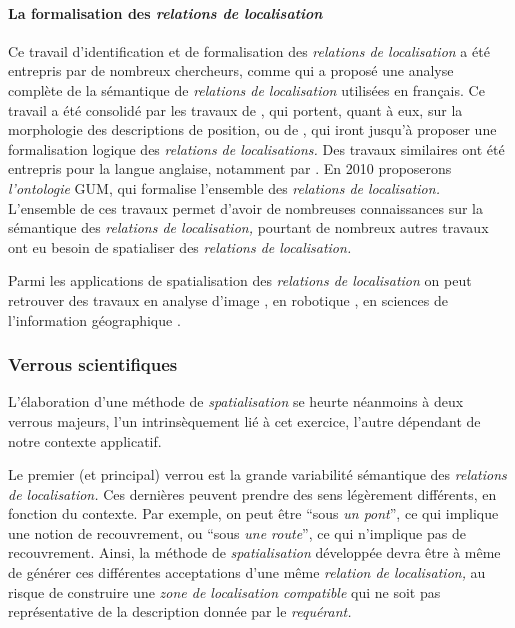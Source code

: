 \paragraph{La formalisation des \emph{relations de localisation}}

Ce travail d'identification et de formalisation des \emph{relations de
  localisation} a été entrepris par de nombreux chercheurs, comme
\textcite{Vandeloise1986} qui a proposé une analyse complète de la
sémantique de \emph{relations de localisation} utilisées en
français. Ce travail a été consolidé par les travaux de
\textcite{Borillo1998}, qui portent, quant à eux, sur la morphologie
des descriptions de position, ou de \textcite{Aurnague1993,
  Aurnague1997}, qui iront jusqu'à proposer une formalisation logique
des \emph{relations de localisations.} Des travaux similaires ont été
entrepris pour la langue anglaise, notamment par
\autocite{Kracht2002,Mark1999,Freksa2018,Carlson2005,Lang1991,Matsakis2010}.
En 2010 \textcite{Bateman2010} proposerons \emph{l'ontologie} GUM, qui
formalise l'ensemble des \emph{relations de localisation.} L'ensemble
de ces travaux permet d'avoir de nombreuses connaissances sur la
sémantique des \emph{relations de localisation,} pourtant de nombreux
autres travaux ont eu besoin de spatialiser des \emph{relations de
  localisation.}

Parmi les applications de spatialisation des \emph{relations de
  localisation} on peut retrouver des travaux en analyse d'image
\autocite{Hudelot2008, Hudelot2008a,Bloch1996, Vanegas2011,
  Takemura2012}, en robotique \autocite{Skubic2004}, en sciences de
l'information géographique
\autocite{Xu2007a,Xu2007,Xu2006,Wolter2018,Dittrich2015,Du2016,Hornsby2009,Mathet2000,Hall2015}.



\subsubsection{Verrous scientifiques}

L’élaboration d'une méthode de \emph{spatialisation} se heurte
néanmoins à deux verrous majeurs, l'un intrinsèquement lié à cet
exercice, l'autre dépendant de notre contexte applicatif.

Le premier (et principal) verrou est la grande variabilité sémantique
des \emph{relations de localisation.} Ces dernières peuvent prendre
des sens légèrement différents, en fonction du contexte. Par exemple,
on peut être \enquote{sous \emph{un pont}}, ce qui implique une notion
de recouvrement, ou \enquote{sous \emph{une route}}, ce qui n'implique
pas de recouvrement. Ainsi, la méthode de \emph{spatialisation}
développée devra être à même de générer ces différentes acceptations
d'une même \emph{relation de localisation,} au risque de construire
une \emph{zone de localisation compatible} qui ne soit pas
représentative de la description donnée par le \emph{requérant.}

